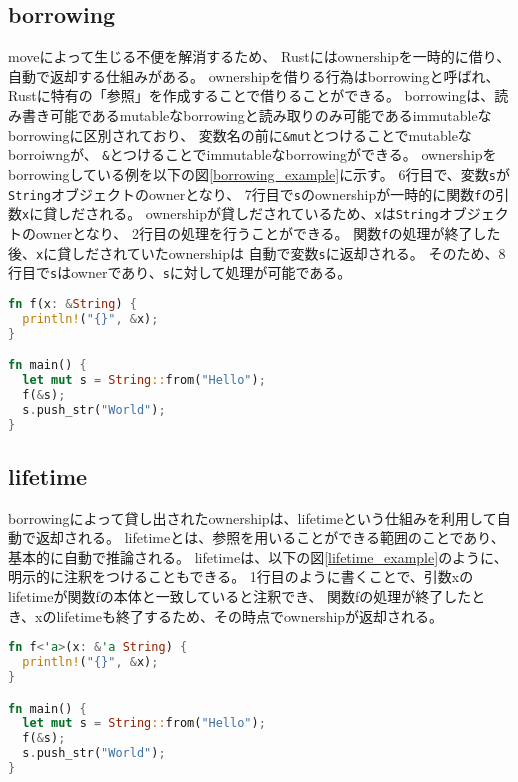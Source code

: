 \documentclass{sumiilab-paper}
\theoremstyle{mystyle}
\numberwithin{definition}{chapter} %
\begin{document}
\subsection{borrowing}
moveによって生じる不便を解消するため、
Rustにはownershipを一時的に借り、自動で返却する仕組みがある。
ownershipを借りる行為はborrowingと呼ばれ、
Rustに特有の「参照」を作成することで借りることができる。
borrowingは、読み書き可能であるmutableなborrowingと読み取りのみ可能であるimmutableなborrowingに区別されており、
変数名の前に\texttt{\&mut}とつけることでmutableなborroiwngが、
\texttt{\&}とつけることでimmutableなborrowingができる。
ownershipをborrowingしている例を以下の図\ref{borrowing_example}に示す。
6行目で、変数\texttt{s}が\texttt{String}オブジェクトのownerとなり、
7行目で\texttt{s}のownershipが一時的に関数\texttt{f}の引数\texttt{x}に貸しだされる。
ownershipが貸しだされているため、\texttt{x}は\texttt{String}オブジェクトのownerとなり、
2行目の処理を行うことができる。
関数\texttt{f}の処理が終了した後、\texttt{x}に貸しだされていたownershipは
自動で変数\texttt{s}に返却される。
そのため、8行目で\texttt{s}はownerであり、\texttt{s}に対して処理が可能である。

\begin{lstlisting}[language=Rust, caption=borrowingの例, label=borrowing_example, captionpos=b]
fn f(x: &String) {
  println!("{}", &x);
}

fn main() {
  let mut s = String::from("Hello");
  f(&s);
  s.push_str("World");
}
\end{lstlisting}

\subsection{lifetime}
borrowingによって貸し出されたownershipは、lifetimeという仕組みを利用して自動で返却される。
lifetimeとは、参照を用いることができる範囲のことであり、基本的に自動で推論される。
lifetimeは、以下の図\ref{lifetime_example}のように、明示的に注釈をつけることもできる。
1行目のように書くことで、引数xのlifetimeが関数fの本体と一致していると注釈でき、
関数fの処理が終了したとき、xのlifetimeも終了するため、その時点でownershipが返却される。
\begin{lstlisting}[language=Rust, caption=lifetime注釈, label=lifetime_example, captionpos=b]
fn f<'a>(x: &'a String) {
  println!("{}", &x);
}

fn main() {
  let mut s = String::from("Hello");
  f(&s);
  s.push_str("World");
}
\end{lstlisting}
\end{document}
